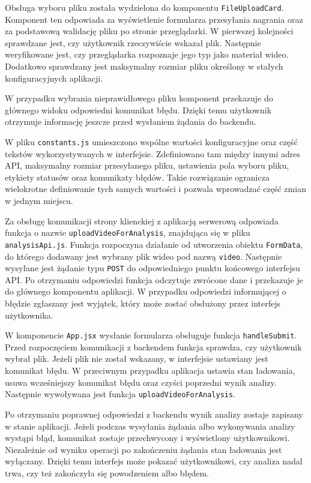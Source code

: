 Obsługa wyboru pliku została wydzielona do komponentu \texttt{FileUploadCard}. Komponent ten odpowiada za wyświetlenie formularza przesyłania nagrania oraz za podstawową walidację pliku po stronie przeglądarki. W pierwszej kolejności sprawdzane jest, czy użytkownik rzeczywiście wskazał plik. Następnie weryfikowane jest, czy przeglądarka rozpoznaje jego typ jako materiał wideo. Dodatkowo sprawdzany jest maksymalny rozmiar pliku określony w stałych konfiguracyjnych aplikacji.

W przypadku wybrania nieprawidłowego pliku komponent przekazuje do głównego widoku odpowiedni komunikat błędu. Dzięki temu użytkownik otrzymuje informację jeszcze przed wysłaniem żądania do backendu.

W pliku \texttt{constants.js} umieszczono wspólne wartości konfiguracyjne oraz część tekstów wykorzystywanych w interfejsie. Zdefiniowano tam między innymi adres API, maksymalny rozmiar przesyłanego pliku, ustawienia pola wyboru pliku, etykiety statusów oraz komunikaty błędów. Takie rozwiązanie ogranicza wielokrotne definiowanie tych samych wartości i pozwala wprowadzać część zmian w jednym miejscu.

Za obsługę komunikacji strony klienckiej z aplikacją serwerową odpowiada funkcja  o nazwie \texttt{uploadVideoForAnalysis}, znajdująca się w pliku \texttt{analysisApi.js}. Funkcja rozpoczyna działanie od utworzenia obiektu \texttt{FormData}, do którego dodawany jest wybrany plik wideo pod nazwą \texttt{video}. Następnie wysyłane jest żądanie typu \texttt{POST} do odpowiedniego punktu końcowego interfejsu API. Po otrzymaniu odpowiedzi funkcja odczytuje zwrócone dane i przekazuje je do głównego komponentu aplikacji. W przypadku odpowiedzi informującej o błędzie zgłaszany jest wyjątek, który może zostać obsłużony przez interfejs użytkownika.

W komponencie \texttt{App.jsx} wysłanie formularza obsługuje funkcja \texttt{handleSubmit}. Przed rozpoczęciem komunikacji z backendem funkcja sprawdza, czy użytkownik wybrał plik. Jeżeli plik nie został wskazany, w interfejsie ustawiany jest komunikat błędu. W przeciwnym przypadku aplikacja ustawia stan ładowania, usuwa wcześniejszy komunikat błędu oraz czyści poprzedni wynik analizy. Następnie wywoływana jest funkcja \texttt{uploadVideoForAnalysis}.

Po otrzymaniu poprawnej odpowiedzi z backendu wynik analizy zostaje zapisany w stanie aplikacji. Jeżeli podczas wysyłania żądania albo wykonywania analizy wystąpi błąd, komunikat zostaje przechwycony i wyświetlony użytkownikowi. Niezależnie od wyniku operacji po zakończeniu żądania stan ładowania jest wyłączany. Dzięki temu interfejs może pokazać użytkownikowi, czy analiza nadal trwa, czy też zakończyła się powodzeniem albo błędem.


